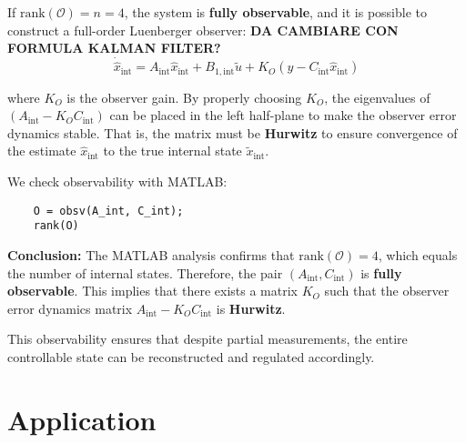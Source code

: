 \documentclass[]{report}
\begin{document}
If $\text{rank}(\mathcal{O}) = n = 4$, the system is \textbf{fully observable}, and it is possible to construct a full-order Luenberger observer:
\textbf{DA CAMBIARE CON FORMULA KALMAN FILTER?}
\[
\dot{\hat{x}}_{\text{int}} = A_{\text{int}} \hat{x}_{\text{int}} + B_{1,\text{int}} \tilde{u} + K_O(y - C_{\text{int}} \hat{x}_{\text{int}})
\]

where $K_O$ is the observer gain. By properly choosing $K_O$, the eigenvalues of $(A_{\text{int}} - K_O C_{\text{int}})$ can be placed in the left half-plane to make the observer error dynamics stable. That is, the matrix must be \textbf{Hurwitz} to ensure convergence of the estimate $\hat{x}_{\text{int}}$ to the true internal state $\tilde{x}_{\text{int}}$.

We check observability with MATLAB:

\begin{verbatim}
	O = obsv(A_int, C_int);
	rank(O)
\end{verbatim}

\textbf{Conclusion:}  
The MATLAB analysis confirms that $\text{rank}(\mathcal{O}) = 4$, which equals the number of internal states. Therefore, the pair $(A_{\text{int}}, C_{\text{int}})$ is \textbf{fully observable}. This implies that there exists a matrix $K_O$ such that the observer error dynamics matrix $A_{\text{int}} - K_O C_{\text{int}}$ is \textbf{Hurwitz}.


This observability ensures that despite partial measurements, the entire controllable state can be reconstructed and regulated accordingly.




\chapter{Application}
\end{document}
